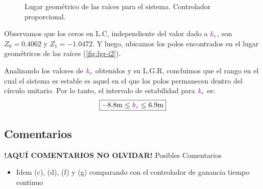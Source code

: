 \begin{figure}[ht]
    \centering
    
    \caption{Lugar geométrico de las raíces para el sistema. Controlador proporcional.}
    \label{fig:lgr-i2}
\end{figure}

Observamos que los ceros en L.C, independiente del valor dado a \(\mathbin{\color{violet}k_c}\),
son $Z_{0} = 0.4062 $ y $Z_{1} = -1.0472$. Y luego, ubicamos los polos encontrados
en el lugar geométricos de las raíces (\autoref{fig:lgr-i2}).

Analizando los valores de \(\mathbin{\color{violet}k_c}\) obtenidos y su L.G.R, concluimos que el
rango en el cual el sistema es estable es aquel en el que los polos permanecen
dentro del círculo unitario. Por lo tanto, el intervalo de estabilidad para \(\mathbin{\color{violet}k_c}\) es:
\begin{equation}
  \boxed{ -8.8\unit{m} \leq \mora{k_{c}} \leq 6.9\unit{m} }
\end{equation}

\FloatBarrier
\subsection{Comentarios}


\textbf{!AQUÍ COMENTARIOS NO OLVIDAR!}
Posibles Comentarios
\begin{itemize}
    \item Idem (c), (d), (f) y (g) comparando con el controlador de ganancia tiempo continuo
\end{itemize}
